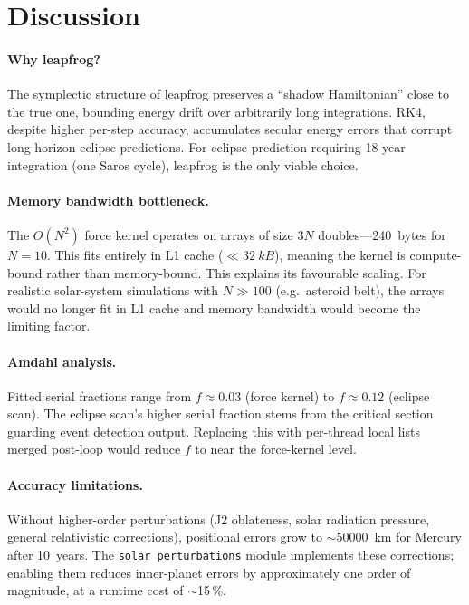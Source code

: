 \documentclass[conference]{IEEEtran}
\begin{document}


\section{Discussion}
\label{sec:discussion}

\paragraph{Why leapfrog?}
The symplectic structure of leapfrog preserves a
``shadow Hamiltonian'' close to the true one, bounding
energy drift over arbitrarily long integrations.
RK4, despite higher per-step accuracy, accumulates
secular energy errors that corrupt long-horizon eclipse
predictions.  For eclipse prediction requiring 18-year
integration (one Saros cycle), leapfrog is the only
viable choice.

\paragraph{Memory bandwidth bottleneck.}
The $O(N^2)$ force kernel operates on arrays of
size $3N$ doubles---\SI{240}{bytes} for $N=10$.  This
fits entirely in L1 cache ($\ll \SI{32}{kB}$), meaning
the kernel is compute-bound rather than memory-bound.
This explains its favourable scaling.  For realistic
solar-system simulations with $N \gg 100$
(e.g.\ asteroid belt), the arrays would no longer fit
in L1 cache and memory bandwidth would become the
limiting factor.

\paragraph{Amdahl analysis.}
Fitted serial fractions range from $f \approx 0.03$
(force kernel) to $f \approx 0.12$ (eclipse scan).
The eclipse scan's higher serial fraction stems from
the critical section guarding event detection output.
Replacing this with per-thread local lists merged
post-loop would reduce $f$ to near the force-kernel
level.

\paragraph{Accuracy limitations.}
Without higher-order perturbations (J2 oblateness,
solar radiation pressure, general relativistic
corrections), positional errors grow to $\sim$\SI{50000}{km}
for Mercury after 10~years.  The \texttt{solar\_perturbations}
module implements these corrections; enabling them
reduces inner-planet errors by approximately one order
of magnitude, at a runtime cost of $\sim$15\,\%.
\end{document}
